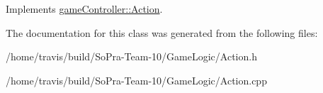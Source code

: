 Implements \hyperlink{classgame_controller_1_1_action}{game\-Controller\-::\-Action}.



The documentation for this class was generated from the following files\-:\begin{DoxyCompactItemize}
\item 
/home/travis/build/\-So\-Pra-\/\-Team-\/10/\-Game\-Logic/Action.\-h\item 
/home/travis/build/\-So\-Pra-\/\-Team-\/10/\-Game\-Logic/Action.\-cpp\end{DoxyCompactItemize}
